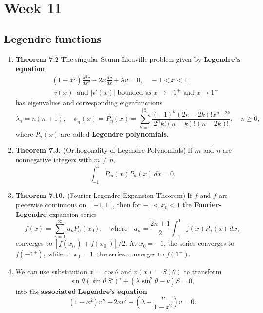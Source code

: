 \chapter{Week 11}
\setcounter{weekpage}{1}
\thispagestyle{plainweek}

\section{Legendre functions}

\begin{enumerate}



\item \textbf{Theorem 7.2} The singular Sturm-Liouville problem given by \textbf{Legendre's equation}
\[
\begin{aligned}
& (1-x^{2})\frac{d^{2}v}{dx^{2}}-2x\frac{dv}{dx}+\lambda  v=0, \quad -1<x<1. \\
& |v(x)| \text{  and  } |v'(x)| \text{  bounded as  } x\to -1^{+} \text{  and  } x\to 1^{-}
\end{aligned}
\]
has eigenvalues and corresponding eigenfunctions
\[\lambda_{n}= n(n+1), \quad \phi_{n}(x)=P_{n}(x)=\sum_{k=0}^{\lfloor \frac{n}{2} \rfloor} \frac{(-1)^{k}(2n-2k)!x^{n-2k}}{2^{n}k!(n-k)!(n-2k)!}, \quad n\geq 0,\]
where $P_{n}(x)$ are called \textbf{Legendre polynomials}.

\item \textbf{Theorem 7.3.} (Orthogonality of Legendre Polynomials) If $m$ and $n$ are nonnegative integers with $m \neq n$,
\[\int_{-1}^{1}P_{m}(x)P_{n}(x)\,dx = 0.\]


\item \textbf{Theorem 7.10.} (Fourier-Legendre Expansion Theorem) If $f$ and $f$ are piecewise continuous on $[-1, 1]$, then for $-1 < x_{ 0} < 1$ the \textbf{Fourier-Legendre} expansion series
\[f(x)=\sum_{n=1}^{\infty} a_{n} P_{n}(x_{0}), \quad \text{where} \quad a_{n} = \frac{2n+1}{2} \int _{-1}^{1} f(x) P_{n}(x) \, dx,\]
converges to $[f(x_{0}^{+})+f({x_{0}^{-}})]/2$. At $x _{0} = -1$, the series converges to $f(-1^{+})$, while at $x _{0} = 1$, the series converges to $f(1^{-})$.


\item We can use substitution $x=\cos\theta$ and $v(x)=S(\theta)$ to transform
\[\sin \theta  \left( \sin\theta\, S ' \right) ' + (\lambda \sin^{2}\theta -\nu )S = 0, \]
into the \textbf{associated Legendre's equation}
\[(1-x^{2})v'' -2xv' + \left( \lambda -\frac{\nu}{1-x^{2}} \right)v = 0.\]


\end{enumerate}



